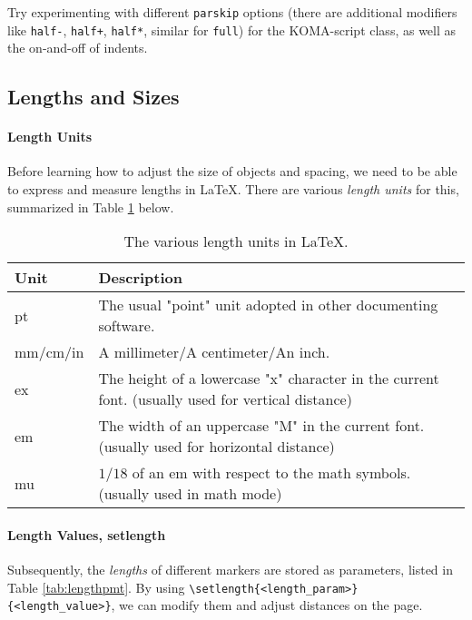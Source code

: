 \begin{exercisebox}
\begin{Exercise}
Try experimenting with different \verb|parskip| options (there are additional modifiers like \verb|half-|, \verb|half+|, \verb|half*|, similar for \verb|full|) for the KOMA-script class, as well as the on-and-off of indents.     
\end{Exercise}
\end{exercisebox}

\subsection{Lengths and Sizes}

\paragraph{Length Units}
Before learning how to adjust the size of objects and spacing, we need to be able to express and measure lengths in \LaTeX{}. There are various \textit{length units} for this, summarized in Table \ref{tab:lengthunit} below.
\begin{table}
\begin{tabularx}{\textwidth}{|l|X|}
\hline
Unit & Description \\
\hline
pt & The usual "point" unit adopted in other documenting software. \\
\hline
mm/cm/in & A millimeter/A centimeter/An inch. \\
\hline
ex & The height of a lowercase "x" character in the current font. (usually used for vertical distance) \\
\hline
em & The width of an uppercase "M" in the current font. (usually used for horizontal distance) \\
\hline
mu & $1/18$ of an em with respect to the math symbols. (usually used in math mode) \\
\hline
\end{tabularx}
\caption{The various length units in \LaTeX{}.}
\label{tab:lengthunit}
\end{table}

\paragraph{Length Values, setlength}
Subsequently, the \textit{lengths} of different markers are stored as parameters, listed in Table \ref{tab:lengthpmt}. By using \texttt{\textbackslash setlength\{<length\_\allowbreak param>\}\{<length\_value>\}}, we can modify them and adjust distances on the page.


